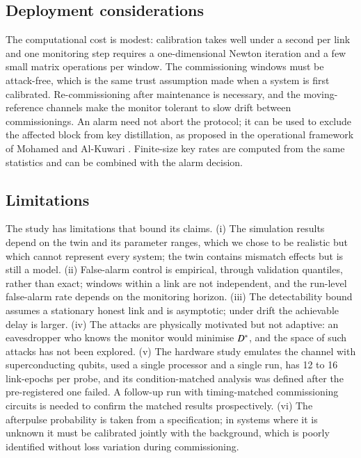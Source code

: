 \subsection{Deployment considerations}

The computational cost is modest: calibration takes well under a second per link and one monitoring step requires a one-dimensional Newton iteration and a few small matrix operations per window. The commissioning windows must be attack-free, which is the same trust assumption made when a system is first calibrated. Re-commissioning after maintenance is necessary, and the moving-reference channels make the monitor tolerant to slow drift between commissionings. An alarm need not abort the protocol; it can be used to exclude the affected block from key distillation, as proposed in the operational framework of Mohamed and Al-Kuwari \cite{MohamedAlKuwari2026}. Finite-size key rates \cite{Tomamichel2012,Lim2014} are computed from the same statistics and can be combined with the alarm decision.

\subsection{Limitations}\label{sec:limitations}

The study has limitations that bound its claims. (i) The simulation results depend on the twin and its parameter ranges, which we chose to be realistic but which cannot represent every system; the twin contains mismatch effects but is still a model. (ii) False-alarm control is empirical, through validation quantiles, rather than exact; windows within a link are not independent, and the run-level false-alarm rate depends on the monitoring horizon. (iii) The detectability bound assumes a stationary honest link and is asymptotic; under drift the achievable delay is larger. (iv) The attacks are physically motivated but not adaptive: an eavesdropper who knows the monitor would minimise $D^{\ast}$, and the space of such attacks has not been explored. (v) The hardware study emulates the channel with superconducting qubits, used a single processor and a single run, has 12 to 16 link-epochs per probe, and its condition-matched analysis was defined after the pre-registered one failed. A follow-up run with timing-matched commissioning circuits is needed to confirm the matched results prospectively. (vi) The afterpulse probability is taken from a specification; in systems where it is unknown it must be calibrated jointly with the background, which is poorly identified without loss variation during commissioning.

